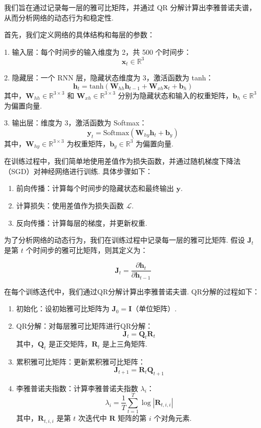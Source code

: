 我们旨在通过记录每一层的雅可比矩阵，并通过 QR 分解计算出李雅普诺夫谱，从而分析网络的动态行为和稳定性. 

首先，我们定义网络的具体结构和每层的参数：

1. 输入层：每个时间步的输入维度为 2，共 500 个时间步：
   \[
   \mathbf{x}_t \in \mathbb{R}^{3}
   \]

2. 隐藏层：一个 RNN 层，隐藏状态维度为 3，激活函数为 tanh：
   \[
   \mathbf{h}_t = \text{tanh}(\mathbf{W}_{hh} \mathbf{h}_{t-1} + \mathbf{W}_{xh} \mathbf{x}_t + \mathbf{b}_h)
   \]
   其中，\(\mathbf{W}_{hh} \in \mathbb{R}^{3 \times 3}\) 和 \(\mathbf{W}_{xh} \in \mathbb{R}^{3 \times 3}\) 分别为隐藏状态和输入的权重矩阵，\(\mathbf{b}_h \in \mathbb{R}^{3}\) 为偏置向量. 

3. 输出层：维度为 3，激活函数为 Softmax：
   \[
   \mathbf{y}_t = \text{Softmax}(\mathbf{W}_{hy} \mathbf{h}_t + \mathbf{b}_y)
   \]
   其中，\(\mathbf{W}_{hy} \in \mathbb{R}^{3 \times 3}\) 为权重矩阵，\(\mathbf{b}_y \in \mathbb{R}^{3}\) 为偏置向量. 

在训练过程中，我们简单地使用差值作为损失函数，并通过随机梯度下降法（SGD）对神经网络进行训练. 具体步骤如下：

\begin{enumerate}
   \item 前向传播：计算每个时间步的隐藏状态和最终输出 \(\mathbf{y}\). 
   \item 计算损失：使用差值作为损失函数 \(\mathcal{L}\). 
   \item 反向传播：计算每层的梯度，并更新权重. 
\end{enumerate}

为了分析网络的动态行为，我们在训练过程中记录每一层的雅可比矩阵. 假设 \(\mathbf{J}_t\) 是第 \(t\) 个时间步的雅可比矩阵，则其定义为：

\[
\mathbf{J}_t = \frac{\partial \mathbf{h}_t}{\partial \mathbf{h}_{t-1}}
\]

在每个训练迭代中，我们通过QR分解计算出李雅普诺夫谱. QR分解的过程如下：

\begin{enumerate}


\item 初始化：设初始雅可比矩阵为 \(\mathbf{J}_0 = \mathbf{I}\)（单位矩阵）. 
\item QR分解：对每层雅可比矩阵进行QR分解：
   \[
   \mathbf{J}_t = \mathbf{Q}_t \mathbf{R}_t
   \]
   其中，\(\mathbf{Q}_t\) 是正交矩阵，\(\mathbf{R}_t\) 是上三角矩阵. 
\item 累积雅可比矩阵：更新累积雅可比矩阵：
   \[
   \mathbf{J}_{t+1} = \mathbf{R}_t \mathbf{Q}_{t+1}
   \]
\item 李雅普诺夫指数：计算李雅普诺夫指数 \(\lambda_i\)：
   \[
   \lambda_i = \frac{1}{T} \sum_{t=1}^T \log |\mathbf{R}_{t,i,i}|
   \]
   其中，\(\mathbf{R}_{t,i,i}\) 是第 \(t\) 次迭代中 \(\mathbf{R}\) 矩阵的第 \(i\) 个对角元素. 

\end{enumerate}

